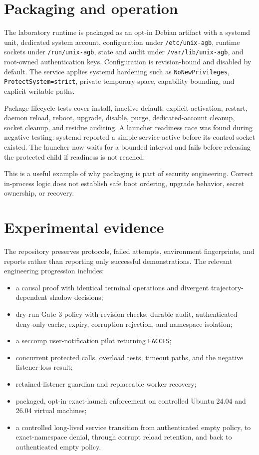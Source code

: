 \documentclass[11pt,a4paper]{article}
\begin{document}
\section{Packaging and operation}

The laboratory runtime is packaged as an opt-in Debian artifact with a systemd
unit, dedicated system account, configuration under \texttt{/etc/unix-agb},
runtime sockets under \texttt{/run/unix-agb}, state and audit under
\texttt{/var/lib/unix-agb}, and root-owned authentication keys. Configuration
is revision-bound and disabled by default. The service applies systemd
hardening such as \texttt{NoNewPrivileges}, \texttt{ProtectSystem=strict},
private temporary space, capability bounding, and explicit writable paths.

Package lifecycle tests cover install, inactive default, explicit activation,
restart, daemon reload, reboot, upgrade, disable, purge, dedicated-account
cleanup, socket cleanup, and residue auditing. A launcher readiness race was
found during negative testing: systemd reported a simple service active before
its control socket existed. The launcher now waits for a bounded interval and
fails before releasing the protected child if readiness is not reached.

This is a useful example of why packaging is part of security engineering.
Correct in-process logic does not establish safe boot ordering, upgrade
behavior, secret ownership, or recovery.

\section{Experimental evidence}

The repository preserves protocols, failed attempts, environment fingerprints,
and reports rather than reporting only successful demonstrations. The relevant
engineering progression includes:

\begin{itemize}[leftmargin=*]
  \item a causal proof with identical terminal operations and divergent
        trajectory-dependent shadow decisions;
  \item dry-run Gate 3 policy with revision checks, durable audit, authenticated
        deny-only cache, expiry, corruption rejection, and namespace isolation;
  \item a seccomp user-notification pilot returning \texttt{EACCES};
  \item concurrent protected calls, overload tests, timeout paths, and the
        negative listener-loss result;
  \item retained-listener guardian and replaceable worker recovery;
  \item packaged, opt-in exact-launch enforcement on controlled Ubuntu 24.04
        and 26.04 virtual machines;
  \item a controlled long-lived service transition from authenticated empty
        policy, to exact-namespace denial, through corrupt reload retention,
        and back to authenticated empty policy.
\end{itemize}
\end{document}
